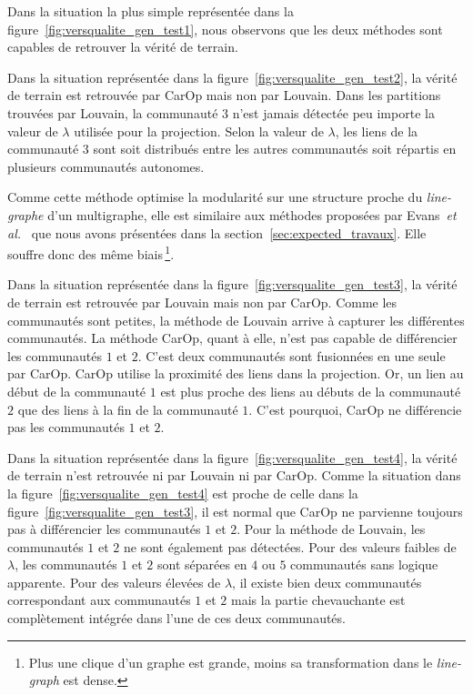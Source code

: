 \bigskip

Dans la situation la plus simple représentée dans la figure~\ref{fig:versqualite_gen_test1}, nous observons que les deux méthodes sont capables de retrouver la vérité de terrain.

Dans la situation représentée dans la figure~\ref{fig:versqualite_gen_test2}, la vérité de terrain est retrouvée par CarOp mais non par Louvain.
Dans les partitions trouvées par Louvain, la communauté $3$ n'est jamais détectée peu importe la valeur de $\lambda$ utilisée pour la projection.
Selon la valeur de $\lambda$, les liens de la communauté $3$ sont soit distribués entre les autres communautés soit répartis en plusieurs communautés autonomes.

Comme cette méthode optimise la modularité sur une structure proche du \emph{line-graphe} d'un multigraphe, elle est similaire aux méthodes proposées par Evans~\emph{et al.}~\cite{Evans2009} que nous avons présentées dans la section~\ref{sec:expected_travaux}.
Elle souffre donc des même biais\,\footnote{Plus une clique d'un graphe est grande, moins sa transformation dans le \emph{line-graph} est dense.}.

Dans la situation représentée dans la figure~\ref{fig:versqualite_gen_test3}, la vérité de terrain est retrouvée par Louvain mais non par CarOp.
Comme les communautés sont petites, la méthode de Louvain arrive à capturer les différentes communautés.
La méthode CarOp, quant à elle, n'est pas capable de différencier les communautés $1$ et $2$.
C'est deux communautés sont fusionnées en une seule par CarOp.
CarOp utilise la proximité des liens dans la projection.
Or, un lien au début de la communauté $1$ est plus proche des liens au débuts de la communauté $2$ que des liens à la fin de la communauté $1$.
C'est pourquoi, CarOp ne différencie pas les communautés $1$ et $2$.

Dans la situation représentée dans la figure~\ref{fig:versqualite_gen_test4}, la vérité de terrain n'est retrouvée ni par Louvain ni par CarOp.
Comme la situation dans la figure~\ref{fig:versqualite_gen_test4} est proche de celle dans la figure~\ref{fig:versqualite_gen_test3}, il est normal que CarOp ne parvienne toujours pas à différencier les communautés $1$ et $2$.
Pour la méthode de Louvain, les communautés $1$ et $2$ ne sont également pas détectées.
Pour des valeurs faibles de $\lambda$, les communautés $1$ et $2$ sont séparées en $4$ ou $5$ communautés sans logique apparente.
Pour des valeurs élevées de $\lambda$, il existe bien deux communautés correspondant aux communautés $1$ et $2$ mais la partie chevauchante est complètement intégrée dans l'une de ces deux communautés.



